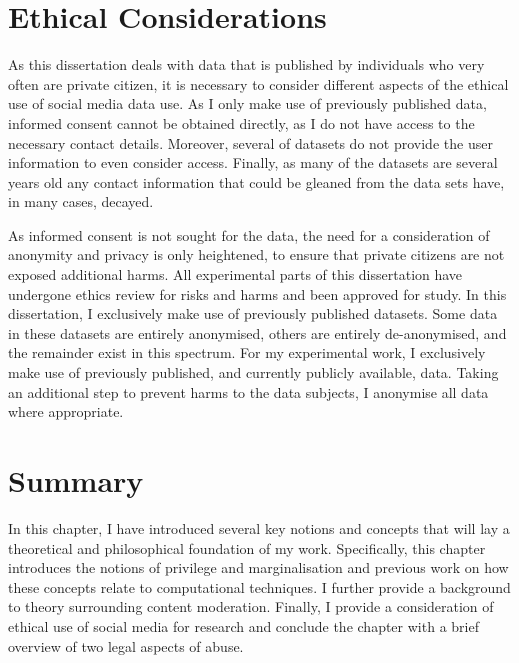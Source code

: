 \section{Ethical Considerations}

As this dissertation deals with data that is published by individuals who very often are private citizen, it is necessary to consider different aspects of the ethical use of social media data use.
As I only make use of previously published data, informed consent cannot be obtained directly, as I do not have access to the necessary contact details.
Moreover, several of datasets do not provide the user information to even consider access.
Finally, as many of the datasets are several years old any contact information that could be gleaned from the data sets have, in many cases, decayed.

As informed consent is not sought for the data, the need for a consideration of anonymity and privacy is only heightened, to ensure that private citizens are not exposed additional harms.
All experimental parts of this dissertation have undergone ethics review for risks and harms and been approved for study.
In this dissertation, I exclusively make use of previously published datasets. Some data in these datasets are entirely anonymised, others are entirely de-anonymised, and the remainder exist in this spectrum.
For my experimental work, I exclusively make use of previously published, and currently publicly available, data.
Taking an additional step to prevent harms to the data subjects, I anonymise all data where appropriate.


\section{Summary}
In this chapter, I have introduced several key notions and concepts that will lay a theoretical and philosophical foundation of my work.
Specifically, this chapter introduces the notions of privilege and marginalisation and previous work on how these concepts relate to computational techniques. I further provide a background to theory surrounding content moderation. Finally, I provide a consideration of ethical use of social media for research and conclude the chapter with a brief overview of two legal aspects of abuse.
